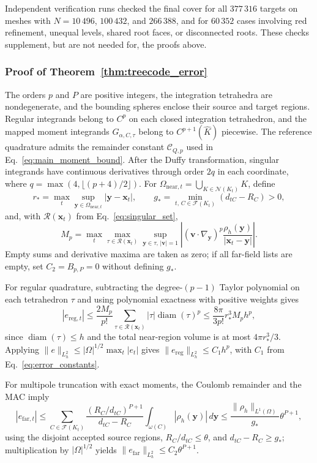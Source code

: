 \documentclass[a4paper,pdflatex,sn-mathphys-num]{sn-jnl}
\theoremstyle{thmstyleone}
\begin{document}
Independent verification runs checked the final cover for all $377\,316$ targets on meshes with $N=10\,496$, $100\,432$, and $266\,388$, and for $60\,352$ cases involving red refinement, unequal levels, shared root faces, or disconnected roots. These checks supplement, but are not needed for, the proofs above.

\subsubsection*{Proof of Theorem~\ref{thm:treecode_error}}
The orders $p$ and $P$ are positive integers, the integration tetrahedra are nondegenerate, and the bounding spheres enclose their source and target regions. Regular integrands belong to $C^p$ on each closed integration tetrahedron, and the mapped moment integrands \(G_{\alpha,C,\tau}\) belong to \(C^{p+1}(\widehat K)\) piecewise. The reference quadrature admits the remainder constant \(\mathcal C_{Q,p}\) used in Eq.~\eqref{eq:main_moment_bound}. After the Duffy transformation, singular integrands have continuous derivatives through order $2q$ in each coordinate, where $q=\max(4,\lfloor(p+4)/2\rfloor)$. For $\Omega_{\mathrm{near},t}=\bigcup_{K\in\mathcal N(K_t)}K$, define
\[
r_*=\max_t\sup_{\mathbf y\in\Omega_{\mathrm{near},t}}
|\mathbf y-\mathbf x_t|,
\qquad
g_*=\min_{t,\,C\in\mathcal F(K_t)}(d_{tC}-R_C)>0,
\]
and, with $\mathcal R(\mathbf x_t)$ from Eq.~\eqref{eq:singular_set},
\[
M_p=\max_t\max_{\tau\in\mathcal R(\mathbf x_t)}
\sup_{\mathbf y\in\tau,\,|\mathbf v|=1}
\left|(\mathbf v\cdot\nabla_{\mathbf y})^p
\frac{\rho_h(\mathbf y)}{|\mathbf x_t-\mathbf y|}\right|.
\]
Empty sums and derivative maxima are taken as zero; if all far-field lists are empty, set $C_2=B_{p,P}=0$ without defining $g_*$.

For regular quadrature, subtracting the degree-$(p-1)$ Taylor polynomial on each tetrahedron $\tau$ and using polynomial exactness with positive weights \cite{Stroud1971,DavisRabinowitz1984} gives
\[
|e_{\mathrm{reg},t}|
\le \frac{2M_p}{p!}
\sum_{\tau\in\mathcal R(\mathbf x_t)}
|\tau|\operatorname{diam}(\tau)^p
\le \frac{8\pi}{3p!}r_*^3M_p h^p,
\]
since $\operatorname{diam}(\tau)\le h$ and the total near-region volume is at most $4\pi r_*^3/3$. Applying $\|e\|_{L_h^2}\le|\Omega|^{1/2}\max_t|e_t|$ gives $\|e_{\mathrm{reg}}\|_{L_h^2}\le C_1h^p$, with $C_1$ from Eq.~\eqref{eq:error_constants}.

For multipole truncation with exact moments, the Coulomb remainder \cite[Theorem~5.2, Eq.~(5.17)]{BeatsonGreengard1997} and the MAC imply
\[
|e_{\mathrm{far},t}|
\le \sum_{C\in\mathcal F(K_t)}
\frac{(R_C/d_{tC})^{P+1}}{d_{tC}-R_C}
\int_{\omega(C)}|\rho_h(\mathbf y)|\,d\mathbf y
\le \frac{\|\rho_h\|_{L^1(\Omega)}}{g_*}\theta^{P+1},
\]
using the disjoint accepted source regions, $R_C/d_{tC}\le\theta$, and $d_{tC}-R_C\ge g_*$; multiplication by $|\Omega|^{1/2}$ yields $\|e_{\mathrm{far}}\|_{L_h^2}\le C_2\theta^{P+1}$.
\end{document}
